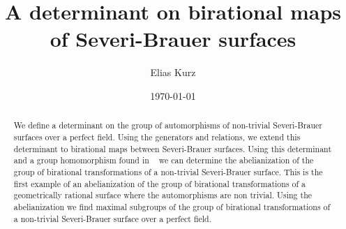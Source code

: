 \documentclass[12pt, oneside, reqno]{amsart}
\title[Severi-Brauer surfaces]{A determinant on birational maps of Severi-Brauer surfaces}
\author{Elias Kurz}
\date{\today}
\begin{document}
\maketitle

 \begin{abstract}
     We define a determinant on the group of automorphisms of non-trivial Severi-Brauer surfaces over a perfect field. Using the generators and relations, we extend this determinant to birational maps between Severi-Brauer surfaces. Using this determinant and a group homomorphism found in ~\cite{BSY} we can determine the abelianization of the group of birational transformations of a non-trivial Severi-Brauer surface. This is the first example of an abelianization of the group of birational transformations of a geometrically rational surface where the automorphisms are non trivial. Using the abelianization we find maximal subgroups of the group of birational transformations of a non-trivial Severi-Brauer surface over a perfect field.
 \end{abstract}

\tableofcontents

\newpage
 
\end{document}

